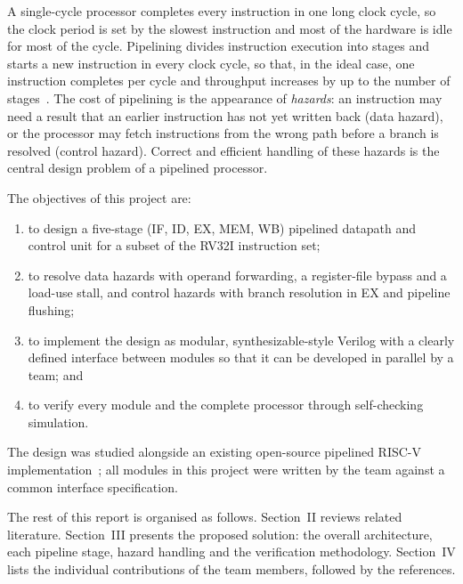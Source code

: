 A single-cycle processor completes every instruction in one long clock cycle, so the clock period
is set by the slowest instruction and most of the hardware is idle for most of the cycle.
Pipelining divides instruction execution into stages and starts a new instruction in every clock
cycle, so that, in the ideal case, one instruction completes per cycle and throughput increases by
up to the number of stages~\cite{patterson_riscv, hennessy_quant}. The cost of pipelining is the
appearance of \emph{hazards}: an instruction may need a result that an earlier instruction has not
yet written back (data hazard), or the processor may fetch instructions from the wrong path before a
branch is resolved (control hazard). Correct and efficient handling of these hazards is the central
design problem of a pipelined processor.

The objectives of this project are:
\begin{enumerate}
  \item to design a five-stage (IF, ID, EX, MEM, WB) pipelined datapath and control unit for a
        subset of the RV32I instruction set;
  \item to resolve data hazards with operand forwarding, a register-file bypass and a load-use
        stall, and control hazards with branch resolution in EX and pipeline flushing;
  \item to implement the design as modular, synthesizable-style Verilog with a clearly defined
        interface between modules so that it can be developed in parallel by a team; and
  \item to verify every module and the complete processor through self-checking simulation.
\end{enumerate}

The design was studied alongside an existing open-source pipelined RISC-V implementation~\cite{protocolx_repo};
all modules in this project were written by the team against a common interface specification.

The rest of this report is organised as follows. Section~II reviews related literature.
Section~III presents the proposed solution: the overall architecture, each pipeline stage, hazard
handling and the verification methodology. Section~IV lists the individual contributions of the team
members, followed by the references.
